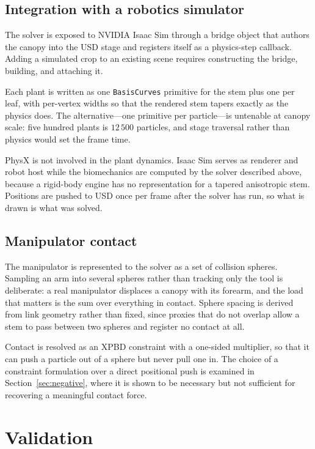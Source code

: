 \documentclass[conference]{IEEEtran}
\begin{document}
\subsection{Integration with a robotics simulator}

The solver is exposed to NVIDIA Isaac Sim through a bridge object that
authors the canopy into the USD stage and registers itself as a physics-step
callback. Adding a simulated crop to an existing scene requires constructing
the bridge, building, and attaching it.

Each plant is written as one \texttt{BasisCurves} primitive for the stem plus
one per leaf, with per-vertex widths so that the rendered stem tapers exactly
as the physics does. The alternative---one primitive per particle---is
untenable at canopy scale: five hundred plants is $12\,500$ particles, and
stage traversal rather than physics would set the frame time.

PhysX is not involved in the plant dynamics. Isaac Sim serves as renderer and
robot host while the biomechanics are computed by the solver described above,
because a rigid-body engine has no representation for a tapered anisotropic
stem. Positions are pushed to USD once per frame after the solver has run, so
what is drawn is what was solved.

\subsection{Manipulator contact}

The manipulator is represented to the solver as a set of collision spheres.
Sampling an arm into several spheres rather than tracking only the tool is
deliberate: a real manipulator displaces a canopy with its forearm, and the
load that matters is the sum over everything in contact. Sphere spacing is
derived from link geometry rather than fixed, since proxies that do not
overlap allow a stem to pass between two spheres and register no contact at
all.

Contact is resolved as an XPBD constraint with a one-sided multiplier, so
that it can push a particle out of a sphere but never pull one in. The choice
of a constraint formulation over a direct positional push is examined in
Section~\ref{sec:negative}, where it is shown to be necessary but not
sufficient for recovering a meaningful contact force.

\section{Validation}
\end{document}
